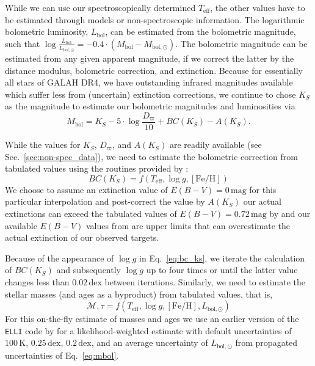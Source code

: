 \documentclass[
  journal=pasa,
  manuscript=research-paper, %
  year=2023,
  volume=37
]{cup-journal}
\begin{document}
While we can use our spectroscopically determined $T_\mathrm{eff}$, the other values have to be estimated through models or non-spectroscopic information. The logarithmic bolometric luminosity, $L_\mathrm{bol}$, can be estimated from the bolometric magnitude, such that $\log \frac{L_\mathrm{bol}}{L_\mathrm{bol,\odot}} = -0.4 \cdot \left(M_\mathrm{bol} - M_\mathrm{bol,\odot} \right)$. The bolometric magnitude can be estimated from any given apparent magnitude, if we correct the latter by the distance modulus, bolometric correction, and extinction. Because for essentially all stars of GALAH DR4, we have outstanding infrared magnitudes available which suffer less from (uncertain) extinction corrections, we continue to chose $K_S$ as the magnitude to estimate our bolometric magnitudes and luminosities via
\begin{equation}
M_\mathrm{bol} = K_S - 5\cdot \log \frac{D_\varpi}{10} + BC(K_S) - A(K_S). \label{eq:mbol}
\end{equation}

While the values for $K_S$, $D_\varpi$, and $A(K_S)$ are readily available (see Sec.~\ref{sec:non-spec_data}), we need to estimate the bolometric correction from tabulated values using the routines provided by \citet{Casagrande2018}:
\begin{equation}
BC(K_S) = f(T_\mathrm{eff}, \log g, \mathrm{[Fe/H]})
\label{eq:bc_ks}
\end{equation}
We choose to assume an extinction value of $E(B-V) = 0\,\mathrm{mag}$ for this particular interpolation and post-correct the value by $A(K_S)$ our actual extinctions can exceed the tabulated values of $E(B-V) = 0.72\,\mathrm{mag}$ by \citet{Casagrande2018} and our available $E(B-V)$ values from \citet{Schlegel1998} are upper limits that can overestimate the actual extinction of our observed targets.

Because of the appearance of $\log g$ in Eq.~\ref{eq:bc_ks}, we iterate the calculation of $BC(K_S)$ and subsequently $\log g$ up to four times or until the latter value changes less than $0.02\,\mathrm{dex}$ between iterations. Similarly, we need to estimate the stellar masses (and ages as a byproduct) from tabulated values, that is,
\begin{equation}
\mathcal{M}, \tau = f(T_\mathrm{eff}, \log g, \mathrm{[Fe/H]}, L_\mathrm{bol,\odot})
\label{eq:mass_age}
\end{equation}
For this on-the-fly estimate of masses and ages we use an earlier version of the \texttt{ELLI} code by \cite{Lin2018} for a likelihood-weighted estimate with default uncertainties of $100\,\mathrm{K}$, $0.25\,\mathrm{dex}$, $0.2\,\mathrm{dex}$, and an average uncertainty of $L_\mathrm{bol,\odot}$ from propagated uncertainties of Eq.~\ref{eq:mbol}.
\end{document}
